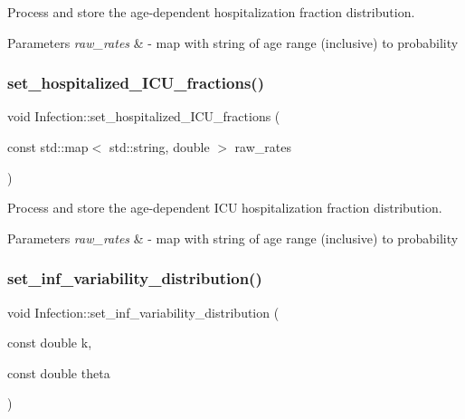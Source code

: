 Process and store the age-\/dependent hospitalization fraction distribution. 


\begin{DoxyParams}{Parameters}
{\em raw\+\_\+rates} & -\/ map with string of age range (inclusive) to probability \\
\hline
\end{DoxyParams}
\mbox{\label{classInfection_a2f502305ea9c698d01e7d572fd304a88}} 
\subsubsection{\texorpdfstring{set\+\_\+hospitalized\+\_\+\+I\+C\+U\+\_\+fractions()}{set\_hospitalized\_ICU\_fractions()}}
{\footnotesize\ttfamily void Infection\+::set\+\_\+hospitalized\+\_\+\+I\+C\+U\+\_\+fractions (\begin{DoxyParamCaption}\item[{const std\+::map$<$ std\+::string, double $>$}]{raw\+\_\+rates }\end{DoxyParamCaption})}



Process and store the age-\/dependent I\+CU hospitalization fraction distribution. 


\begin{DoxyParams}{Parameters}
{\em raw\+\_\+rates} & -\/ map with string of age range (inclusive) to probability \\
\hline
\end{DoxyParams}
\mbox{\label{classInfection_acf663b8dd4e7befb65b02221b7bdf037}} 
\subsubsection{\texorpdfstring{set\+\_\+inf\+\_\+variability\+\_\+distribution()}{set\_inf\_variability\_distribution()}}
{\footnotesize\ttfamily void Infection\+::set\+\_\+inf\+\_\+variability\+\_\+distribution (\begin{DoxyParamCaption}\item[{const double}]{k,  }\item[{const double}]{theta }\end{DoxyParamCaption})\hspace{0.3cm}{\ttfamily [inline]}}

